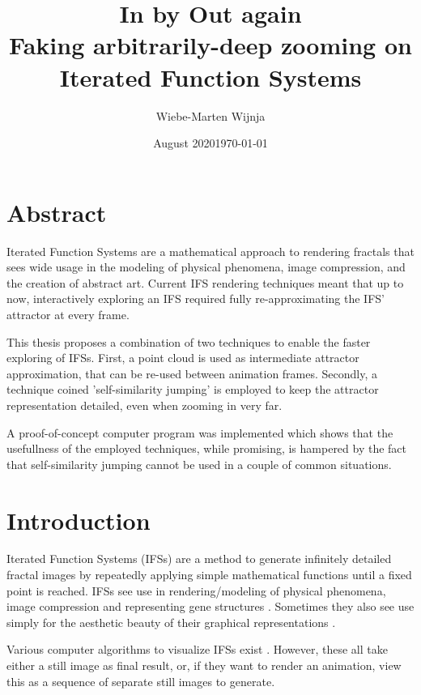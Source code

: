 \documentclass[11pt]{article}
\date{August 2020}
\author{Wiebe-Marten Wijnja}
\date{\today}
\title{\Huge In by Out again\\\medskip
\large Faking arbitrarily-deep zooming on Iterated Function Systems}
\begin{document}
\maketitle
\setcounter{tocdepth}{4}
\tableofcontents

\listoftodos


\section{Abstract}
\label{sec:org9854f1c}

Iterated Function Systems are a mathematical approach to rendering fractals that sees wide usage in the modeling of physical phenomena, 
image compression, and the creation of abstract art.
Current IFS rendering techniques meant that up to now, interactively exploring an IFS required fully re-approximating the IFS' attractor at every frame.

This thesis proposes a combination of two techniques to enable the faster exploring of IFSs.
First, a point cloud is used as intermediate attractor approximation, that can be re-used between animation frames.
Secondly, a technique coined 'self-similarity jumping' is employed to keep the attractor representation detailed, even when zooming in very far.

A proof-of-concept computer program was implemented which shows that the usefullness of the employed techniques, while promising, 
is hampered by the fact that self-similarity jumping cannot be used in a couple of common situations.

\section{Introduction}
\label{sec:orgd1b06aa}

Iterated Function Systems (IFSs) are a method to generate infinitely detailed fractal images 
by repeatedly applying simple mathematical functions until a fixed point is reached. \cite{barnsley2014fractals}
IFSs see use in rendering/modeling of physical phenomena, image compression \cite{hart1996fractal} and representing gene structures \cite{jeffrey1990chaos}.
Sometimes they also see use simply for the aesthetic beauty of their graphical representations \cite{draves2003fractal}.

Various computer algorithms to visualize IFSs exist \cite{hepting1991rendering}.
However, these all take either a still image as final result, or, if they want to render an animation,
view this as a sequence of separate still images to generate.
\end{document}
